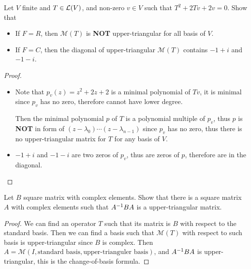 \documentclass[../main.tex]{subfiles}
\begin{document}
\begin{exercise}
  Let $V$ finite and $T \in \mathcal{L}(V)$, and non-zero $v \in V$ such that $T^2 + 2Tv + 2v = 0$.
  Show that
  \begin{itemize}
    \item If $F = R$, then $\mathcal{M}(T)$ is \textbf{NOT} upper-triangular for all basis of $V$.
    \item If $F = C$, then the diagonal of upper-triangular $\mathcal{M}(T)$ contains $-1 + i$ and $-1 - i$.
  \end{itemize}
\end{exercise}
\begin{proof}
  ~
  \begin{itemize}
    \item Note that $p_v(z) = z^2 + 2z + 2$ is a minimal polynomial of $Tv$,
          it is minimal since $p_v$ has no zero, therefore cannot have lower degree.

          Then the minimal polynomial $p$ of $T$ is a polynomial multiple of $p_v$,
          thus $p$ is \textbf{NOT} in form of $(z - \lambda_0) \cdots (z - \lambda_{n - 1})$
          since $p_v$ has no zero, thus there is no upper-triangular matrix for $T$ for any basis of $V$.
    \item $- 1 + i$ and $- 1 - i$ are two zeros of $p_v$, thus are zeros of $p$, therefore are
          in the diagonal.
  \end{itemize}
\end{proof}

\begin{exercise}
  Let $B$ square matrix with complex elements. Show that there is a square matrix $A$
  with complex elements such that $A^{-1}BA$ is a upper-triangular matrix.
\end{exercise}
\begin{proof}
  We can find an operator $T$ such that its matrix is $B$ with respect to the standard basis.
  Then we can find a basis such that $\mathcal{M}(T)$ with respect to such basis is upper-triangular
  since $B$ is complex.
  Then \\ $A = \mathcal{M}(I, \text{standard basis}, \text{upper-trianguler basis})$,
  and $A^{-1}BA$ is upper-triangular, this is the change-of-basis formula.
\end{proof}
\end{document}
